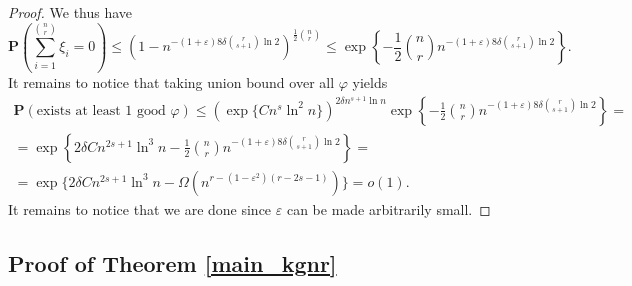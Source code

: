 \documentclass[10pt,a4paper]{article}
\theoremstyle{remark}
\theoremstyle{definition}
\newcommand{\mP}{\mathbf{P}}
\newcommand{\skob}[1]{\left(#1\right)}
\begin{document}
\begin{proof}
    We thus have
    $$
         \mP\skob{\sum_{i = 1}^{\binom{n}{r}}\xi_i = 0} \leq \skob{1 - n^{-(1+\varepsilon)8\delta\binom{r}{s+1}\ln 2}}^{\frac{1}{2}\binom{n}{r}} \leq \exp\left\{-\frac{1}{2}\binom{n}{r}n^{-(1+\varepsilon)8\delta\binom{r}{s+1}\ln 2}\right\}.
    $$
    It remains to notice that taking union bound over all $\varphi$ yields 
    \begin{multline*}
        \mP(\text{exists at least } 1 \text{ good } \varphi) \leq (\exp\{Cn^s\ln^2 n\})^{2\delta n^{s+1}\ln n}\exp\left\{-\frac{1}{2}\binom{n}{r}n^{-(1+\varepsilon)8\delta\binom{r}{s+1}\ln 2}\right\} = \\ = \exp\left\{2\delta Cn^{2s+1}\ln^3 n - \frac{1}{2}\binom{n}{r}n^{-(1+\varepsilon)8\delta\binom{r}{s+1}\ln 2}\right\} = \\ = \exp\{2\delta Cn^{2s+1}\ln^3 n - \Omega(n^{r-(1-\varepsilon^2)(r-2s-1)})\} = o(1).
    \end{multline*}
    It remains to notice that we are done since $\varepsilon$ can be made arbitrarily small.
\end{proof}


\subsection{Proof of Theorem \ref{main_kgnr}}
\end{document}
